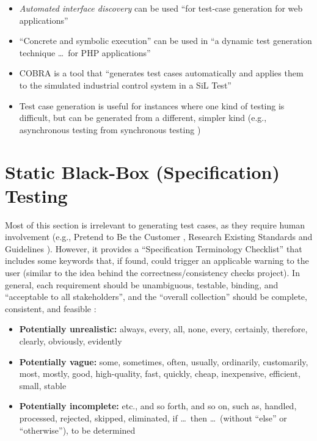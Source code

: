 \begin{itemize}
\begin{itemize}
            \end{itemize}
      \item \emph{Automated interface discovery} can be used ``for test-case
            generation for web applications'' \citep[p.~184]{DoğanEtAl2014}
      \item ``Concrete and symbolic execution'' can be used in ``a dynamic test
            generation technique \dots\ for PHP applications''
            \citep[p.~192]{DoğanEtAl2014} 
      \item COBRA is a tool that ``generates test cases automatically and
            applies them to the simulated industrial control system in a SiL
            Test'' \citep[p.~2]{PreußeEtAl2012}
      \item Test case generation is useful for instances where one kind of
            testing is difficult, but can be generated from a different,
            simpler kind (e.g., asynchronous testing from synchronous testing
            \citep{JardEtAl1999})
\end{itemize}

\section[Static Black-Box (Specification) Testing]{Static Black-Box
  (Specification) Testing \citep[pp.~56-62]{Patton2006}}

Most of this section is irrelevant to generating test cases, as they require
human involvement  (e.g., Pretend to Be the Customer
\citep[pp.~57-58]{Patton2006}, Research Existing Standards and
Guidelines \citep[pp.~58-59]{Patton2006}). However, it provides a
``Specification Terminology Checklist'' \citep[p.~61]{Patton2006} that
includes some keywords that, if found, could trigger an applicable warning to
the user (similar to the idea behind the correctness/consistency checks
project). In general, each requirement should be unambiguous, testable,
binding, and ``acceptable to all stakeholders'', and the ``overall collection''
should be complete, consistent, and feasible \citep[p.~1-8]{SWEBOK2024}:

\begin{itemize}
      \item \textbf{Potentially unrealistic:} always, every, all, none, every,
            certainly, therefore, clearly, obviously, evidently
      \item \textbf{Potentially vague:} some, sometimes, often, usually,
            ordinarily, customarily, most, mostly, good, high-quality, fast,
            quickly, cheap, inexpensive, efficient, small, stable
      \item \textbf{Potentially incomplete:} etc., and so forth, and so on,
            such as, handled, processed, rejected, skipped, eliminated,
            if \dots\ then \dots\ (without ``else'' or ``otherwise''),
            to be determined \citep[p.~408]{vanVliet2000}
\end{itemize}

